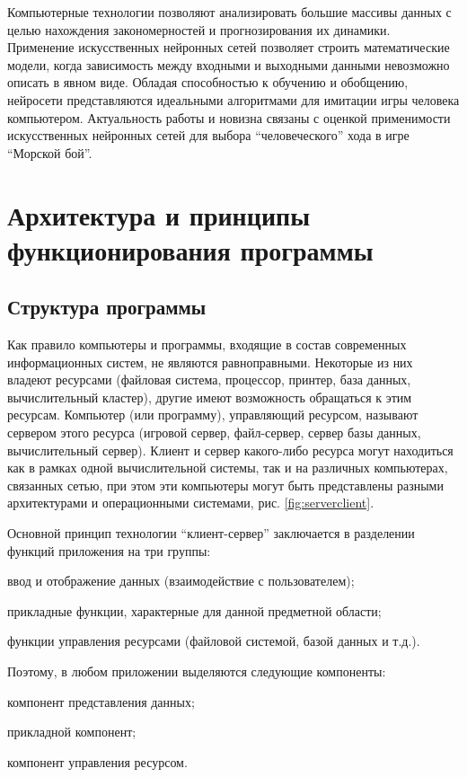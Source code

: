 \documentclass[12pt, a4paper, oneside]{article}
\begin{document}
Компьютерные технологии позволяют анализировать большие массивы данных с целью нахождения закономерностей  и прогнозирования их динамики. Применение искусственных нейронных сетей позволяет строить математические модели, когда зависимость между входными и выходными данными невозможно описать в явном виде. Обладая способностью к обучению и обобщению, нейросети представляются идеальными алгоритмами для имитации игры человека компьютером. Актуальность работы и новизна связаны с оценкой применимости искусственных нейронных сетей для выбора ``человеческого'' хода в игре ``Морской бой''. 

\section{Архитектура и принципы функционирования программы}
\subsection{Структура программы}

Как правило компьютеры и программы, входящие в состав современных информационных систем, не являются равноправными. Некоторые из них владеют ресурсами (файловая система, процессор, принтер, база данных, вычислительный кластер), другие имеют возможность обращаться к этим ресурсам. Компьютер (или программу), управляющий ресурсом, называют сервером этого ресурса (игровой сервер, файл-сервер, сервер базы данных, вычислительный сервер). Клиент и сервер какого-либо ресурса могут находиться как в рамках одной вычислительной системы, так и на различных компьютерах, связанных сетью, при этом эти компьютеры могут быть представлены разными архитектурами и операционными системами, рис. \ref{fig:serverclient}.

Основной принцип технологии ``клиент-сервер'' заключается в разделении функций приложения на три группы:
\begin{enumerate*}
    \item ввод и отображение данных (взаимодействие с пользователем);
    \item прикладные функции, характерные для данной предметной области;
    \item функции управления ресурсами (файловой системой, базой данных и т.д.). 
\end{enumerate*}

Поэтому, в любом приложении выделяются следующие компоненты:
\begin{enumerate*}
    \item компонент представления данных;
    \item прикладной компонент;
    \item компонент управления ресурсом. 
\end{enumerate*}
\end{document}
